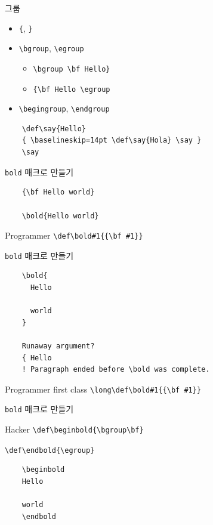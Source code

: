 \documentclass{beamer}
\begin{document}
%
\begin{frame}[fragile]{그룹}
  \begin{itemize}
  \item \verb+{+, \verb+}+
  \item \verb+\bgroup+, \verb+\egroup+
    \begin{exampleblock}{}
      \begin{itemize}
      \item \verb+\bgroup \bf Hello}+
      \item \verb+{\bf Hello \egroup+
      \end{itemize}
    \end{exampleblock}
  \item \verb+\begingroup+, \verb+\endgroup+
  \end{itemize}

  \begin{verbatim}
    \def\say{Hello}
    { \baselineskip=14pt \def\say{Hola} \say }
    \say
  \end{verbatim}
\end{frame}


%
\begin{frame}[fragile]{\texttt{bold} 매크로 만들기}
  \begin{verbatim}
    {\bf Hello world}
    
    \bold{Hello world}
  \end{verbatim}
  \begin{alertblock}{Programmer}
    \verb+\def\bold#1{{\bf #1}}+
  \end{alertblock}
\end{frame}


%
\begin{frame}[fragile]{\texttt{bold} 매크로 만들기}
  \begin{verbatim}
    \bold{
      Hello

      world
    }

    Runaway argument?
    { Hello
    ! Paragraph ended before \bold was complete.
  \end{verbatim}
  \begin{alertblock}{Programmer first class}
    \verb+\long\def\bold#1{{\bf #1}}+
  \end{alertblock}
\end{frame}


%
\begin{frame}[fragile]{\texttt{bold} 매크로 만들기}
  \begin{alertblock}{Hacker}
    \verb+\def\beginbold{\bgroup\bf}+
    
    \verb+\def\endbold{\egroup}+
  \end{alertblock}

  \begin{verbatim}
    \beginbold
    Hello

    world
    \endbold
  \end{verbatim}
\end{frame}
\end{document}
